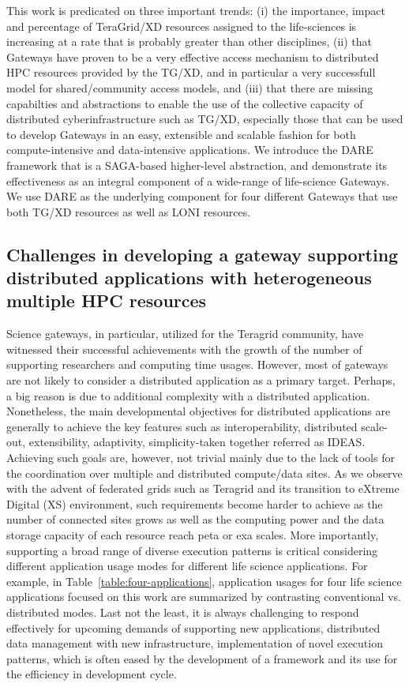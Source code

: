 \documentclass{sig-alternate}
\begin{document}
This work is predicated on three important trends: (i) the importance,
impact and percentage of TeraGrid/XD resources assigned to the
life-sciences is increasing at a rate that is probably greater than
other disciplines, (ii) that Gateways have proven to be a very
effective access mechanism to distributed HPC resources provided by
the TG/XD, and in particular a very successfull model for
shared/community access models, and (iii) that there are missing
capabilties and abstractions to enable the use of the collective
capacity of distributed cyberinfrastructure such as TG/XD, especially
those that can be used to develop Gateways in an easy, extensible and
scalable fashion for both compute-intensive and data-intensive
applications. We introduce the DARE framework that is a SAGA-based
higher-level abstraction, and demonstrate its effectiveness as an
integral component of a wide-range of life-science Gateways. We
use DARE as the underlying component for four different
Gateways that use both TG/XD resources as well as LONI resources.






\subsection{Challenges in developing a gateway supporting distributed applications with heterogeneous multiple HPC resources}

Science gateways, in particular, utilized for the Teragrid community, have witnessed their successful achievements with the growth of the number of supporting researchers and computing time usages.  However, most of gateways are not likely to consider a distributed application as a primary target.  Perhaps, a big reason is due to additional complexity with a distributed application.  Nonetheless, the main developmental objectives for distributed applications are generally to achieve the key features such as interoperability, distributed scale-out, extensibility, adaptivity, simplicity-taken together referred as IDEAS.  Achieving such goals are, however, not trivial mainly due to the lack of tools for the coordination over multiple and distributed compute/data sites.  As we observe with the advent of federated grids such as Teragrid and its transition to eXtreme Digital (XS) environment, such requirements become harder to achieve as the number of connected sites grows as well as the computing power and the data storage capacity of each resource reach peta or exa scales.   More importantly, supporting a broad range of diverse execution patterns is critical considering different application usage modes for different life science applications.  For example, in Table~\ref{table:four-applications}, application usages for four life science applications focused on this work are summarized by contrasting conventional vs. distributed modes.  Last not the least, it is always challenging to respond effectively for upcoming demands of supporting new applications, distributed data management with new infrastructure, implementation of novel execution patterns, which is often eased by the development of a framework and its use for the efficiency in development cycle.   
\end{document}
